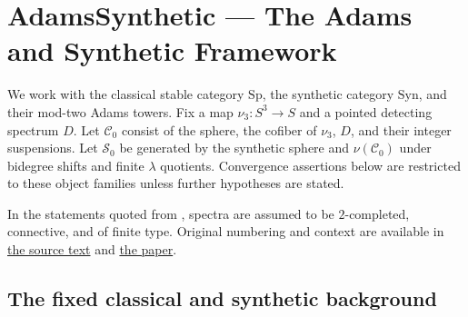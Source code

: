 \chapter{AdamsSynthetic --- The Adams and Synthetic Framework}
We work with the classical stable category $\mathrm{Sp}$, the synthetic category $\mathrm{Syn}$, and their mod-two Adams towers. Fix a map $\nu_3\colon S^3\to S$ and a pointed detecting spectrum $D$. Let $\mathcal C_0$ consist of the sphere, the cofiber of $\nu_3$, $D$, and their integer suspensions. Let $\mathcal S_0$ be generated by the synthetic sphere and $\nu(\mathcal C_0)$ under bidegree shifts and finite $\lambda$ quotients. Convergence assertions below are restricted to these object families unless further hypotheses are stated.

In the statements quoted from \cite{LWX126}, spectra are assumed to be $2$-completed, connective, and of finite type. Original numbering and context are available in \href{paper/main.tex.html}{the source text} and \href{paper/2412.10879.pdf}{the paper}.



\section{The fixed classical and synthetic background}


